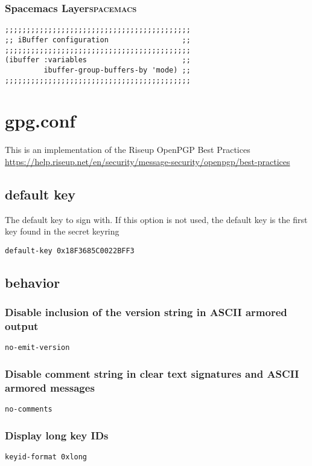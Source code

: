 \documentclass[11pt]{article}
\begin{document}
\subsubsection{Spacemacs Layer\hfill{}\textsc{spacemacs}}
\label{sec:org087e389}
\begin{verbatim}
;;;;;;;;;;;;;;;;;;;;;;;;;;;;;;;;;;;;;;;;;;;
;; iBuffer configuration                 ;;
;;;;;;;;;;;;;;;;;;;;;;;;;;;;;;;;;;;;;;;;;;;
(ibuffer :variables                      ;;
         ibuffer-group-buffers-by 'mode) ;;
;;;;;;;;;;;;;;;;;;;;;;;;;;;;;;;;;;;;;;;;;;;
\end{verbatim}




\section{gpg.conf}
\label{sec:org825cc85}

This is an implementation of the Riseup OpenPGP Best Practices
\url{https://help.riseup.net/en/security/message-security/openpgp/best-practices}


\subsection{default key}
\label{sec:org8e66ed1}
The default key to sign with. If this option is not used, the default key is the first key found in the secret keyring
\begin{verbatim}
default-key 0x18F3685C0022BFF3
\end{verbatim}
\subsection{behavior}
\label{sec:org2840c88}
\subsubsection{Disable inclusion of the version string in ASCII armored output}
\label{sec:orgc39f4f5}
\begin{verbatim}
no-emit-version
\end{verbatim}
\subsubsection{Disable comment string in clear text signatures and ASCII armored messages}
\label{sec:org889a6a7}
\begin{verbatim}
no-comments
\end{verbatim}
\subsubsection{Display long key IDs}
\label{sec:org848ef04}
\begin{verbatim}
keyid-format 0xlong
\end{verbatim}
\end{document}
